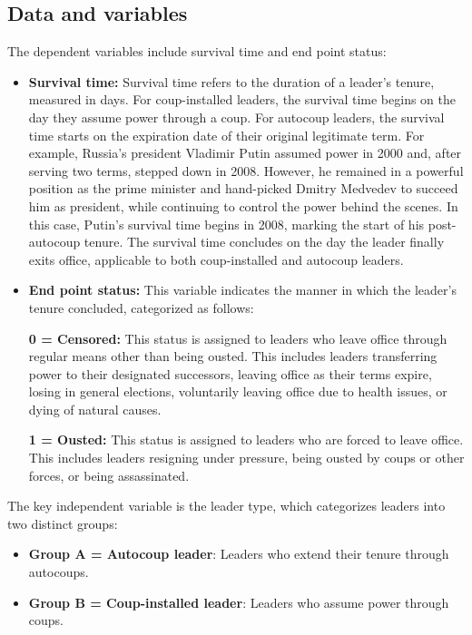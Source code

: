 \documentclass[
  12pt,
]{report}
\providecommand{\tightlist}{%
  \setlength{\itemsep}{0pt}\setlength{\parskip}{0pt}}\usepackage{longtable,booktabs,array}
\begin{document}
\subsection{Data and variables}\label{data-and-variables-1}

The dependent variables include survival time and end point status:

\begin{itemize}
\item
  \textbf{Survival time:} Survival time refers to the duration of a
  leader's tenure, measured in days. For coup-installed leaders, the
  survival time begins on the day they assume power through a coup. For
  autocoup leaders, the survival time starts on the expiration date of
  their original legitimate term. For example, Russia's president
  Vladimir Putin assumed power in 2000 and, after serving two terms,
  stepped down in 2008. However, he remained in a powerful position as
  the prime minister and hand-picked Dmitry Medvedev to succeed him as
  president, while continuing to control the power behind the scenes. In
  this case, Putin's survival time begins in 2008, marking the start of
  his post-autocoup tenure. The survival time concludes on the day the
  leader finally exits office, applicable to both coup-installed and
  autocoup leaders.
\item
  \textbf{End point status:} This variable indicates the manner in which
  the leader's tenure concluded, categorized as follows:

  \textbf{0 = Censored:} This status is assigned to leaders who leave
  office through regular means other than being ousted. This includes
  leaders transferring power to their designated successors, leaving
  office as their terms expire, losing in general elections, voluntarily
  leaving office due to health issues, or dying of natural causes.

  \textbf{1 = Ousted:} This status is assigned to leaders who are forced
  to leave office. This includes leaders resigning under pressure, being
  ousted by coups or other forces, or being assassinated.
\end{itemize}

The key independent variable is the leader type, which categorizes
leaders into two distinct groups:

\begin{itemize}
\tightlist
\item
  \textbf{Group A = Autocoup leader}: Leaders who extend their tenure
  through autocoups.
\item
  \textbf{Group B = Coup-installed leader}: Leaders who assume power
  through coups.
\end{itemize}
\end{document}
